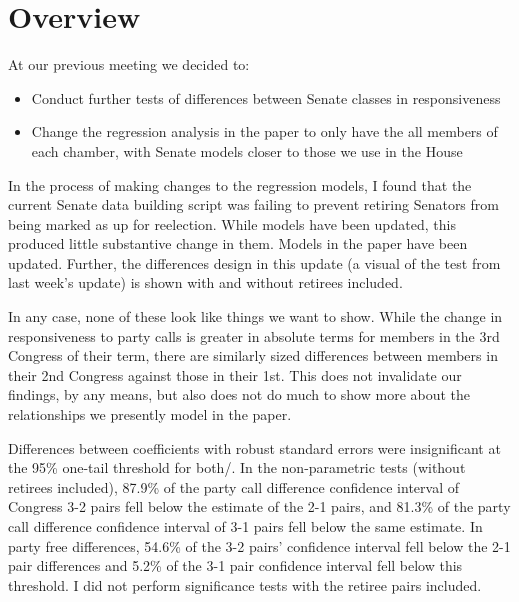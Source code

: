 \documentclass[12pt]{article}
\begin{document}
\section{Overview}

At our previous meeting we decided to:

\begin{itemize}
	
	\item Conduct further tests of differences between Senate classes in responsiveness
	
	\item Change the regression analysis in the paper to only have the all members of each chamber, with Senate models closer to those we use in the House
	
\end{itemize}

In the process of making changes to the regression models, I found that the current Senate data building script was failing to prevent retiring Senators from being marked as up for reelection. While models have been updated, this produced little substantive change in them. Models in the paper have been updated. Further, the differences design in this update (a visual of the test from last week's update) is shown with and without retirees included.

In any case, none of these look like things we want to show. While the change in responsiveness to party calls is greater in absolute terms for members in the 3rd Congress of their term, there are similarly sized differences between members in their 2nd Congress against those in their 1st. This does not invalidate our findings, by any means, but also does not do much to show more about the relationships we presently model in the paper.

Differences between coefficients with robust standard errors were insignificant at the 95\% one-tail threshold for both/. In the non-parametric tests (without retirees included), 87.9\% of the party call difference confidence interval of Congress 3-2 pairs fell below the estimate of the 2-1 pairs, and 81.3\% of the party call difference confidence interval of 3-1 pairs fell below the same estimate. In party free differences, 54.6\% of the 3-2 pairs' confidence interval fell below the 2-1 pair differences and 5.2\% of the 3-1 pair confidence interval fell below this threshold. I did not perform significance tests with the retiree pairs included.

\pagebreak
\end{document}
